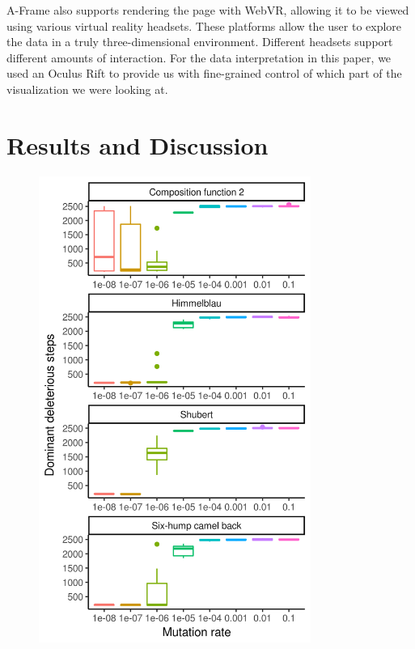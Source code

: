 \documentclass[letterpaper]{article}
\begin{document}
A-Frame also supports rendering the page with WebVR, allowing it to be viewed using various virtual reality headsets. These platforms allow the user to explore the data in a truly three-dimensional environment. Different headsets support different amounts of interaction. For the data interpretation in this paper, we used an Oculus Rift to provide us with fine-grained control of which part of the visualization we were looking at.


\section{Results and Discussion}
\begin{figure}
\includegraphics[width=3.5in]{figs/dom_deleterious_mutation_rate.png}
\end{figure}


\end{document}
